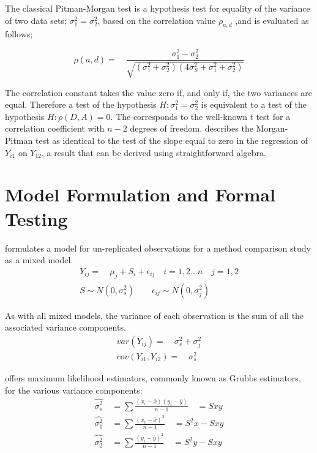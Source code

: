 \documentclass[12pt, a4paper]{article}
\begin{document}
	The classical Pitman-Morgan test is a hypothesis test for equality
	of the variance of two data sets; $\sigma^{2}_{1} =
	\sigma^{2}_{2}$, based on the correlation value $\rho_{a,d}$ ,and
	is evaluated as follows;
	
	\begin{equation}
		\rho(a,d)=\quad\frac{\sigma^{2}_{1}-\sigma^{2}_{2}}{\sqrt{(\sigma^{2}_{1}+\sigma^{2}_{2})(4\sigma^{2}_{S}+\sigma^{2}_{1}+\sigma^{2}_{2})}}
	\end{equation}
	
	The correlation constant takes the value zero if, and only if, the two variances are equal. Therefore a test of the hypothesis $H: \sigma^{2}_{1}=\sigma^{2}_{2}$ is equivalent to a test of the hypothesis $H: \rho(D,A) = 0$. The corresponds to the well-known
	$t$ test for a correlation coefficient with $n-2$ degrees of freedom. \citet{Bartko} describes the Morgan-Pitman test as identical to
	the test of the slope equal to zero in the regression of $Y_{i1}$ on $Y_{12}$, a result that can be derived using
	straightforward algebra.
	
	

\section{Model Formulation and Formal Testing}

\citet{Kinsella} formulates a model for un-replicated observations
for a method comparison study as a mixed model.
\begin{eqnarray}
	Y_{ij} =\quad \mu_{j} + S_{i} + \epsilon_{ij} \quad i=1,2...n\quad
	j=1,2\\
	S \sim N(0,\sigma^{2}_{s})\qquad \epsilon_{ij} \sim
	N(0,\sigma^{2}_{j}) \nonumber
\end{eqnarray}

As with all mixed models, the variance of each observation is the
sum of all the associated variance components.
\begin{eqnarray}
	var(Y_{ij}) =\quad \sigma^{2}_{s} + \sigma^{2}_{j} \\
	cov(Y_{i1},Y_{i2})=\quad \sigma^{2}_{s} \nonumber
\end{eqnarray}

\citet{Grubbs48} offers maximum likelihood estimators, commonly
known as Grubbs estimators, for the various variance components:
\begin{eqnarray}
	\hat{\sigma^{2}_{s}} \quad= \sum{\frac{(x_{i}-\bar{x})(y_{i}-\bar{y})}{n-1}}\quad=Sxy\\
	\hat{\sigma^{2}_{1}} \quad= \sum{\frac{(x_{i}-\bar{x})^{2}}{n-1}} \quad=S^{2}x-Sxy \nonumber\\
	\hat{\sigma^{2}_{2}} \quad=
	\sum{\frac{(y_{i}-\bar{y})^{2}}{n-1}}\quad=S^{2}y-Sxy \nonumber
	\nonumber
\end{eqnarray}
\end{document}
